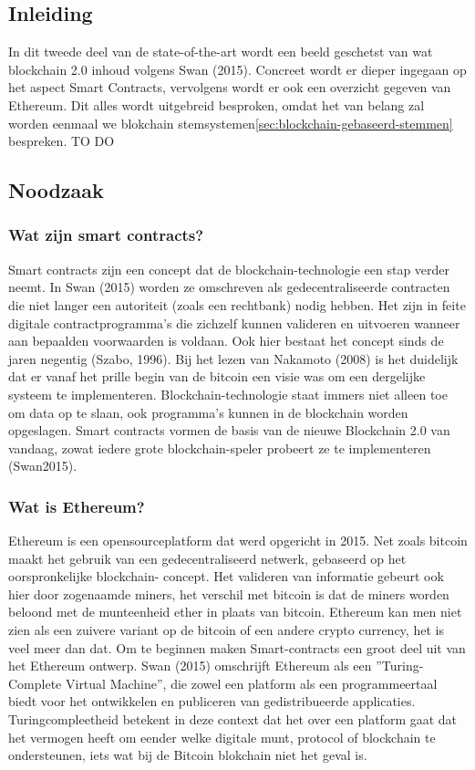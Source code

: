 	\subsection*{Inleiding}
		In dit tweede deel van de state-of-the-art wordt een beeld geschetst van wat blockchain 2.0 inhoud volgens Swan (2015). Concreet wordt er dieper ingegaan op het aspect Smart Contracts, vervolgens wordt er ook een overzicht gegeven van Ethereum. Dit alles wordt uitgebreid besproken, omdat het van belang zal worden eenmaal we blokchain stemsystemen\ref{sec:blockchain-gebaseerd-stemmen} bespreken.
		TO DO
	\subsection{Noodzaak}
		\subsubsection{Wat  zijn smart contracts?}
			Smart contracts zijn een concept dat de blockchain-technologie een stap verder neemt. In Swan (2015) worden ze omschreven als gedecentraliseerde contracten die niet langer een autoriteit (zoals een rechtbank) nodig hebben. Het zijn in feite digitale contractprogramma’s die zichzelf kunnen valideren en uitvoeren wanneer aan bepaalden voorwaarden is voldaan. Ook hier bestaat het concept sinds de jaren negentig (Szabo, 1996). Bij het lezen van Nakamoto (2008) is het duidelijk dat er vanaf het prille begin van de bitcoin een visie was om een dergelijke systeem te implementeren. Blockchain-technologie staat immers niet alleen toe om data op te slaan, ook programma’s kunnen in de blockchain worden opgeslagen. Smart contracts vormen de basis van de nieuwe Blockchain 2.0 van vandaag, zowat iedere grote blockchain-speler probeert ze te implementeren (Swan2015).
		\subsubsection{Wat is Ethereum?}
			Ethereum is een opensourceplatform dat werd opgericht in 2015. Net zoals bitcoin maakt het gebruik van een gedecentraliseerd netwerk, gebaseerd op het oorspronkelijke blockchain- concept. Het valideren van informatie gebeurt ook hier door zogenaamde miners, het verschil met bitcoin is dat de miners worden beloond met de munteenheid ether in plaats van bitcoin. Ethereum kan men niet zien als een zuivere variant op de bitcoin of een andere crypto currency, het is veel meer dan dat. Om te beginnen maken Smart-contracts  een groot deel uit van het Ethereum ontwerp. Swan (2015) omschrijft Ethereum als een ”Turing-Complete Virtual Machine”, die zowel een platform als een programmeertaal biedt voor het ontwikkelen en publiceren van gedistribueerde applicaties. Turingcompleetheid betekent in deze context dat het over een platform gaat dat het vermogen heeft om eender welke digitale munt, protocol of blockchain te ondersteunen, iets wat bij de Bitcoin blokchain niet het geval is. 
			
